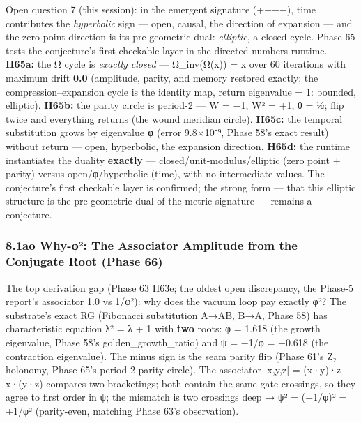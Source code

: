 \documentclass[
]{article}
\begin{document}
Open question 7 (this session): in the emergent signature (+−−−), time
contributes the \emph{hyperbolic} sign --- open, causal, the direction
of expansion --- and the zero-point direction is its pre-geometric dual:
\emph{elliptic}, a closed cycle. Phase 65 tests the conjecture's first
checkable layer in the directed-numbers runtime. \textbf{H65a:} the Ω
cycle is \emph{exactly closed} --- Ω\_inv(Ω(x)) = x over 60 iterations
with maximum drift \textbf{0.0} (amplitude, parity, and memory restored
exactly; the compression--expansion cycle is the identity map,
\textbar return eigenvalue\textbar{} = 1: bounded, elliptic).
\textbf{H65b:} the parity circle is period-2 --- W = −1, W² = +1, θ = ½;
flip twice and everything returns (the wound meridian circle).
\textbf{H65c:} the temporal substitution grows by eigenvalue \textbf{φ}
(error 9.8×10⁻⁹, Phase 58's exact result) without return --- open,
hyperbolic, the expansion direction. \textbf{H65d:} the runtime
instantiates the duality \textbf{exactly} ---
closed/unit-modulus/elliptic (zero point + parity) versus
open/φ/hyperbolic (time), with no intermediate values. The conjecture's
first checkable layer is confirmed; the strong form --- that this
elliptic structure is the pre-geometric dual of the metric signature ---
remains a conjecture.

\subsubsection{8.1ao Why-φ²: The Associator Amplitude from the Conjugate
Root (Phase
66)}\label{ao-why-ux3c6uxb2-the-associator-amplitude-from-the-conjugate-root-phase-66}

The top derivation gap (Phase 63 H63e; the oldest open discrepancy, the
Phase-5 report's associator 1.0 vs 1/φ²): why does the vacuum loop pay
exactly φ²? The substrate's exact RG (Fibonacci substitution A→AB, B→A,
Phase 58) has characteristic equation λ² = λ + 1 with \textbf{two}
roots: φ = 1.618 (the growth eigenvalue, Phase 58's
golden\_growth\_ratio) and ψ = −1/φ = −0.618 (the contraction
eigenvalue). The minus sign is the seam parity flip (Phase 61's Z₂
holonomy, Phase 65's period-2 parity circle). The associator {[}x,y,z{]}
= (x·y)·z − x·(y·z) compares two bracketings; both contain the same gate
crossings, so they agree to first order in ψ; the mismatch is two
crossings deep → ψ² = (−1/φ)² = +1/φ² (parity-even, matching Phase 63's
observation).
\end{document}
